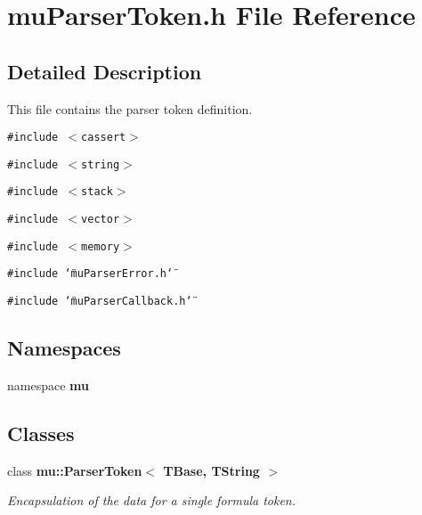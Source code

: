 \section{muParserToken.h File Reference}
\label{muParserToken_8h}


\subsection{Detailed Description}
This file contains the parser token definition. 



{\tt \#include $<$cassert$>$}\par
{\tt \#include $<$string$>$}\par
{\tt \#include $<$stack$>$}\par
{\tt \#include $<$vector$>$}\par
{\tt \#include $<$memory$>$}\par
{\tt \#include \char`\"{}muParserError.h\char`\"{}}\par
{\tt \#include \char`\"{}muParserCallback.h\char`\"{}}\par
\subsection*{Namespaces}
\begin{CompactItemize}
\item 
namespace {\bf mu}
\end{CompactItemize}
\subsection*{Classes}
\begin{CompactItemize}
\item 
class {\bf mu::ParserToken$<$ TBase, TString $>$}
\begin{CompactList}\small\item\em Encapsulation of the data for a single formula token. \item\end{CompactList}\end{CompactItemize}
